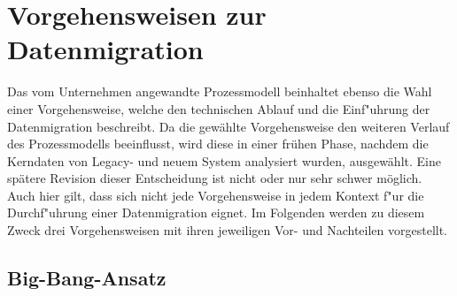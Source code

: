 \section{Vorgehensweisen zur Datenmigration}
\label{chapter:vorgehensweisen}


Das vom Unternehmen angewandte Prozessmodell beinhaltet ebenso die Wahl einer Vorgehensweise, welche den technischen Ablauf und die Einf"uhrung der Datenmigration beschreibt. Da die gewählte Vorgehensweise den weiteren Verlauf des Prozessmodells beeinflusst, wird diese in einer frühen Phase, nachdem die Kerndaten von Legacy- und neuem System analysiert wurden, ausgewählt. Eine spätere Revision dieser Entscheidung ist nicht oder nur sehr schwer möglich. Auch hier gilt, dass sich nicht jede Vorgehensweise in jedem Kontext f"ur die Durchf"uhrung einer Datenmigration eignet. Im Folgenden werden zu diesem Zweck drei Vorgehensweisen mit ihren jeweiligen Vor- und Nachteilen vorgestellt. 

\subsection{Big-Bang-Ansatz}


